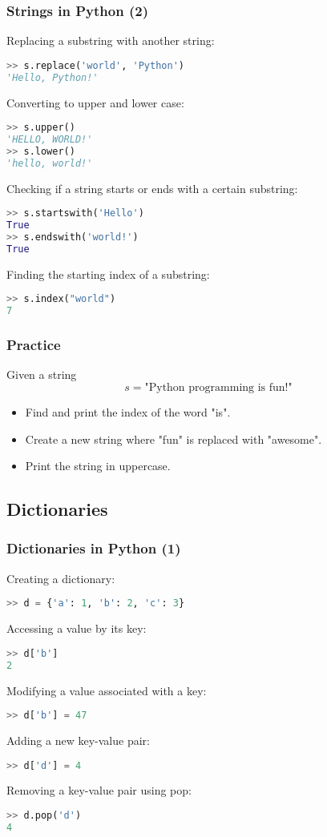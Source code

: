 \begin{frame}[fragile]
  \frametitle{Strings in Python (2)}
  Replacing a substring with another string:
  \begin{lstlisting}[language=Python]
>> s.replace('world', 'Python')
'Hello, Python!'
  \end{lstlisting}\pause
  Converting to upper and lower case:
  \begin{lstlisting}[language=Python]
>> s.upper()
'HELLO, WORLD!'
>> s.lower()
'hello, world!'
  \end{lstlisting}\pause
  Checking if a string starts or ends with a certain substring:
  \begin{lstlisting}[language=Python]
>> s.startswith('Hello')
True
>> s.endswith('world!')
True
  \end{lstlisting}
  Finding the starting index of a substring:
  \begin{lstlisting}[language=Python]
>> s.index("world")
7
  \end{lstlisting}
\end{frame}

\begin{frame}[fragile]
  \frametitle{Practice}
  Given a string
  \[
     s = \text{"Python programming is fun!"}
  \]
  \begin{itemize}
   \item Find and print the index of the word "is".\pause
   \item Create a new string where "fun" is replaced with "awesome".\pause
   \item Print the string in uppercase.
  \end{itemize}
 \end{frame}


\subsection*{Dictionaries}
\begin{frame}[fragile]
  \frametitle{Dictionaries in Python (1)}
  Creating a dictionary:
  \begin{lstlisting}[language=Python]
>> d = {'a': 1, 'b': 2, 'c': 3}
  \end{lstlisting}\pause
  Accessing a value by its key:
  \begin{lstlisting}[language=Python]
>> d['b']
2
  \end{lstlisting}\pause
  Modifying a value associated with a key:
  \begin{lstlisting}[language=Python]
>> d['b'] = 47
  \end{lstlisting}\pause
  Adding a new key-value pair:
  \begin{lstlisting}[language=Python]
>> d['d'] = 4
  \end{lstlisting}\pause
  Removing a key-value pair using pop:
  \begin{lstlisting}[language=Python]
>> d.pop('d')
4
  \end{lstlisting}
\end{frame}

